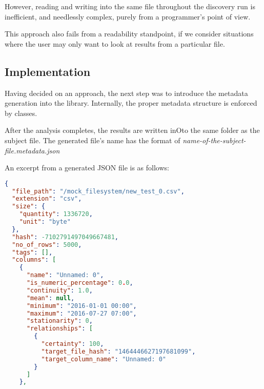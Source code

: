 However, reading and writing into the same file throughout the discovery run is inefficient, and
needlessly complex, purely from a programmer's point of view.

This approach also fails from a readability standpoint, if we consider situations where the user
may only want to look at results from a particular file.

\subsection{Implementation}

Having decided on an approach, the next step was to introduce the metadata generation into the library.
Internally, the proper metadata structure is enforced by classes.

After the analysis completes, the results are written inOto the same folder as the subject file.
The generated file's name has the format of \textit{name-of-the-subject-file.metadata.json}

An excerpt from a generated JSON file is as follows:

\newline

\begin{lstlisting}[language=json,firstnumber=1]
{
  "file_path": "/mock_filesystem/new_test_0.csv",
  "extension": "csv",
  "size": {
    "quantity": 1336720,
    "unit": "byte"
  },
  "hash": -7102791497049667481,
  "no_of_rows": 5000,
  "tags": [],
  "columns": [
    {
      "name": "Unnamed: 0",
      "is_numeric_percentage": 0.0,
      "continuity": 1.0,
      "mean": null,
      "minimum": "2016-01-01 00:00",
      "maximum": "2016-07-27 07:00",
      "stationarity": 0,
      "relationships": [
        {
          "certainty": 100,
          "target_file_hash": "1464446627197681099",
          "target_column_name": "Unnamed: 0"
        }
      ]
    },
\end{lstlisting}
